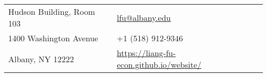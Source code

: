 \documentclass{resume_liang} %
\begin{document}
	
\begin{tabu} to \linewidth {X[l]X[r]}
	Hudson Building, Room 103     &  \href{mailto:lfu@albany.edu}{lfu@albany.edu}  \\
	1400 Washington Avenue        & +1 (518) 912-9346\\
	Albany, NY 12222              & \href{https://liang-fu-econ.github.io/website/}{https://liang-fu-econ.github.io/website/}
\end{tabu}
\bigskip \bigskip









\end{document}
